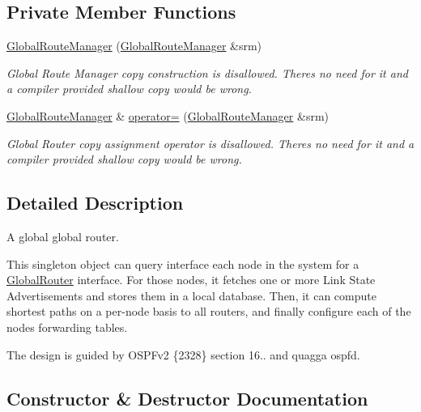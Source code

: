 \subsection*{Private Member Functions}
\begin{DoxyCompactItemize}
\item 
\hyperlink{classns3_1_1GlobalRouteManager_a96c2527a57f934de88689f065ea5a742}{Global\+Route\+Manager} (\hyperlink{classns3_1_1GlobalRouteManager}{Global\+Route\+Manager} \&srm)
\begin{DoxyCompactList}\small\item\em Global Route Manager copy construction is disallowed. There\textquotesingle{}s no need for it and a compiler provided shallow copy would be wrong. \end{DoxyCompactList}\item 
\hyperlink{classns3_1_1GlobalRouteManager}{Global\+Route\+Manager} \& \hyperlink{classns3_1_1GlobalRouteManager_a9b86dc22a0fb5d9f1b9d445d6b9cfff6}{operator=} (\hyperlink{classns3_1_1GlobalRouteManager}{Global\+Route\+Manager} \&srm)
\begin{DoxyCompactList}\small\item\em Global Router copy assignment operator is disallowed. There\textquotesingle{}s no need for it and a compiler provided shallow copy would be wrong. \end{DoxyCompactList}\end{DoxyCompactItemize}


\subsection{Detailed Description}
A global global router. 

This singleton object can query interface each node in the system for a \hyperlink{classns3_1_1GlobalRouter}{Global\+Router} interface. For those nodes, it fetches one or more Link State Advertisements and stores them in a local database. Then, it can compute shortest paths on a per-\/node basis to all routers, and finally configure each of the node\textquotesingle{}s forwarding tables.

The design is guided by O\+S\+P\+Fv2 \{2328\} section 16.. and quagga ospfd. 

\subsection{Constructor \& Destructor Documentation}
